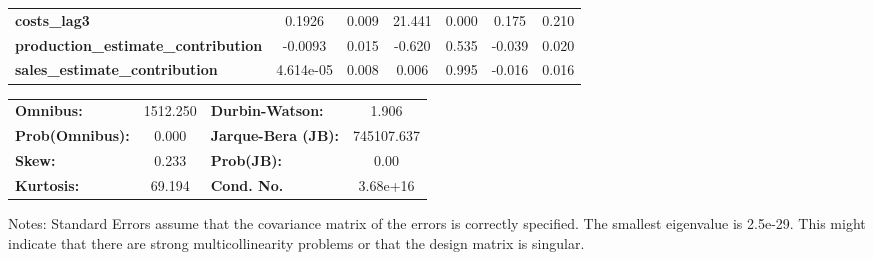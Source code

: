 \begin{center}
\begin{tabular}{lcccccc}
\textbf{costs\_lag3}                        &       0.1926  &        0.009     &    21.441  &         0.000        &        0.175    &        0.210     \\
\textbf{production\_estimate\_contribution} &      -0.0093  &        0.015     &    -0.620  &         0.535        &       -0.039    &        0.020     \\
\textbf{sales\_estimate\_contribution}      &    4.614e-05  &        0.008     &     0.006  &         0.995        &       -0.016    &        0.016     \\
\bottomrule
\end{tabular}
\begin{tabular}{lclc}
\textbf{Omnibus:}       & 1512.250 & \textbf{  Durbin-Watson:     } &     1.906   \\
\textbf{Prob(Omnibus):} &   0.000  & \textbf{  Jarque-Bera (JB):  } & 745107.637  \\
\textbf{Skew:}          &   0.233  & \textbf{  Prob(JB):          } &      0.00   \\
\textbf{Kurtosis:}      &  69.194  & \textbf{  Cond. No.          } &  3.68e+16   \\
\bottomrule
\end{tabular}
\end{center}

Notes: \newline
 [1] Standard Errors assume that the covariance matrix of the errors is correctly specified. \newline
 [2] The smallest eigenvalue is 2.5e-29. This might indicate that there are \newline
 strong multicollinearity problems or that the design matrix is singular.